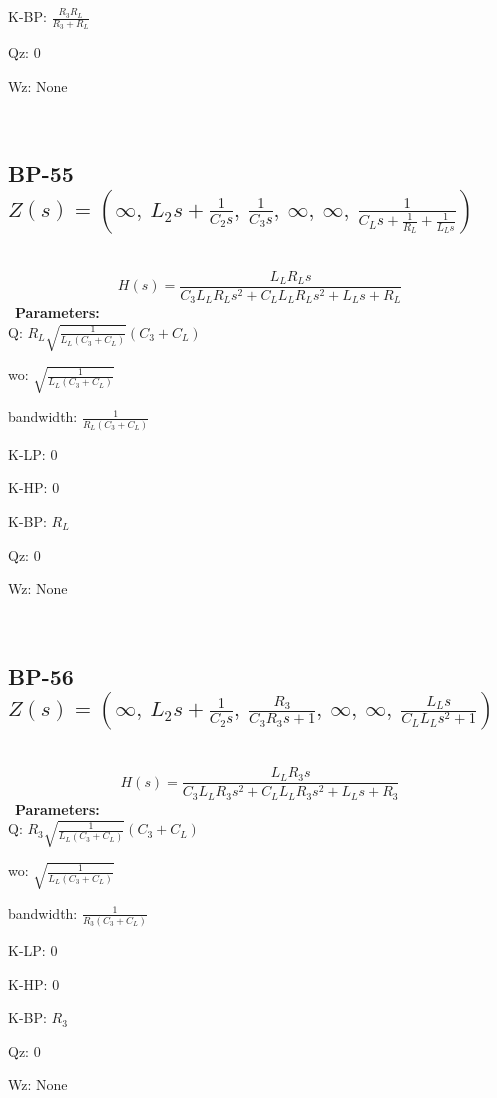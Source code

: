\documentclass{article}
\begin{document}
K-BP: $\frac{R_{3} R_{L}}{R_{3} + R_{L}}$\ 

Qz: $0$\ 

Wz: $\text{None}$\ 

\ 

\subsection{BP-55 $Z(s) = \left( \infty, \  L_{2} s + \frac{1}{C_{2} s}, \  \frac{1}{C_{3} s}, \  \infty, \  \infty, \  \frac{1}{C_{L} s + \frac{1}{R_{L}} + \frac{1}{L_{L} s}}\right)$ } \ 
\textbf{\[H(s) = \frac{L_{L} R_{L} s}{C_{3} L_{L} R_{L} s^{2} + C_{L} L_{L} R_{L} s^{2} + L_{L} s + R_{L}}\] } \ 
\textbf{Parameters:}\\ 

Q: $R_{L} \sqrt{\frac{1}{L_{L} \left(C_{3} + C_{L}\right)}} \left(C_{3} + C_{L}\right)$\ 

wo: $\sqrt{\frac{1}{L_{L} \left(C_{3} + C_{L}\right)}}$\ 

bandwidth: $\frac{1}{R_{L} \left(C_{3} + C_{L}\right)}$\ 

K-LP: $0$\ 

K-HP: $0$\ 

K-BP: $R_{L}$\ 

Qz: $0$\ 

Wz: $\text{None}$\ 

\ 

\subsection{BP-56 $Z(s) = \left( \infty, \  L_{2} s + \frac{1}{C_{2} s}, \  \frac{R_{3}}{C_{3} R_{3} s + 1}, \  \infty, \  \infty, \  \frac{L_{L} s}{C_{L} L_{L} s^{2} + 1}\right)$ } \ 
\textbf{\[H(s) = \frac{L_{L} R_{3} s}{C_{3} L_{L} R_{3} s^{2} + C_{L} L_{L} R_{3} s^{2} + L_{L} s + R_{3}}\] } \ 
\textbf{Parameters:}\\ 

Q: $R_{3} \sqrt{\frac{1}{L_{L} \left(C_{3} + C_{L}\right)}} \left(C_{3} + C_{L}\right)$\ 

wo: $\sqrt{\frac{1}{L_{L} \left(C_{3} + C_{L}\right)}}$\ 

bandwidth: $\frac{1}{R_{3} \left(C_{3} + C_{L}\right)}$\ 

K-LP: $0$\ 

K-HP: $0$\ 

K-BP: $R_{3}$\ 

Qz: $0$\ 

Wz: $\text{None}$\ 
\end{document}
